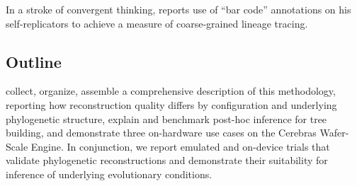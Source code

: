

In a stroke of convergent thinking, \citet{ackley2023robust} reports use of ``bar code'' annotations on his self-replicators to achieve a measure of coarse-grained lineage tracing.


\subsection{Outline}

collect, organize, assemble a comprehensive description of this methodology, reporting how reconstruction quality differs by configuration and underlying phylogenetic structure, explain and benchmark post-hoc inference for tree building, and demonstrate three on-hardware use cases on the Cerebras Wafer-Scale Engine.
In conjunction, we report emulated and on-device trials that validate phylogenetic reconstructions and demonstrate their suitability for inference of underlying evolutionary conditions.

